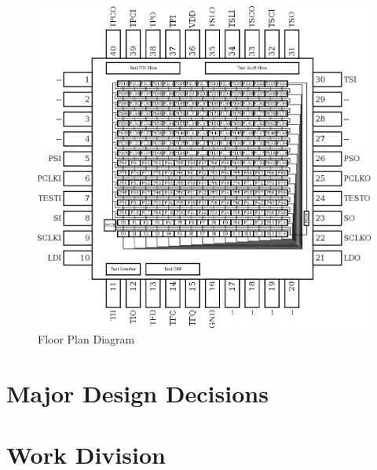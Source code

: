    \begin{figure}[H]
        \centering
        \includegraphics[width=\linewidth]{../floorplan/floorplan.png}
        \caption{Floor Plan Diagram}
        \label{fig:floorplan}
    \end{figure}

\section{Major Design Decisions}
\section{Work Division}

